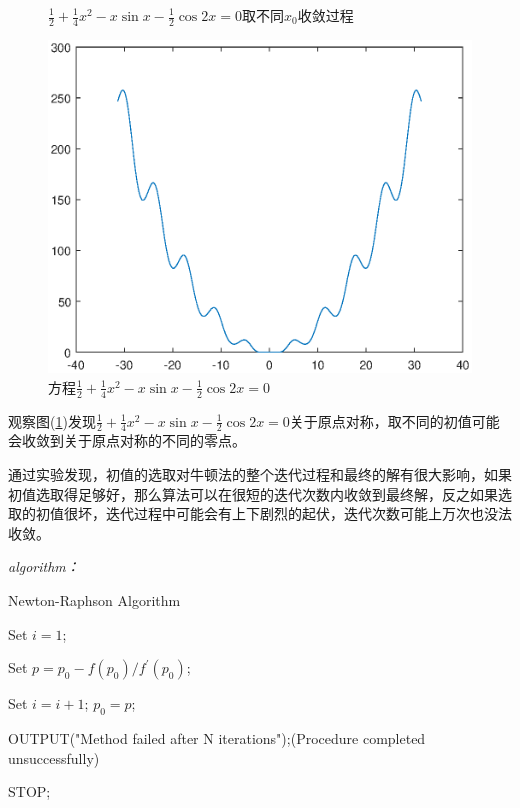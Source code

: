 \documentclass[12pt]{ctexart}
\begin{document}
\begin{figure}[htbp]
{		}
		\caption{$\frac{1}{2}+\frac{1}{4}x^2-x\sin x-\frac{1}{2}\cos 2x=0$取不同$x_0$收敛过程}
	\end{figure}
	
	\begin{figure}[htbp]
		\centering
		\includegraphics[scale=0.7]{e2_3_f10pi.eps}
		\caption{方程$\frac{1}{2}+\frac{1}{4}x^2-x\sin x-\frac{1}{2}\cos 2x=0$}\label{e2_3}
	\end{figure}
	
	观察图(\ref{e2_3})发现$\frac{1}{2}+\frac{1}{4}x^2-x\sin x-\frac{1}{2}\cos 2x=0$关于原点对称，取不同的初值可能会收敛到关于原点对称的不同的零点。
	
	通过实验发现，初值的选取对牛顿法的整个迭代过程和最终的解有很大影响，如果初值选取得足够好，那么算法可以在很短的迭代次数内收敛到最终解，反之如果选取的初值很坏，迭代过程中可能会有上下剧烈的起伏，迭代次数可能上万次也没法收敛。
	
	\textit{algorithm：}
	
	\begin{algorithm}
		\caption{Newton-Raphson Algorithm}
		Set $i=1$;
		
		{
			Set $p=p_0-f(p_0)/f^{'}(p_0)$;
			
			
			Set $i=i+1$; $p_0=p$;
		}
		
		OUTPUT("Method failed after N iterations");(Procedure completed unsuccessfully)
		
		STOP;
	\end{algorithm}
	
\end{document}
